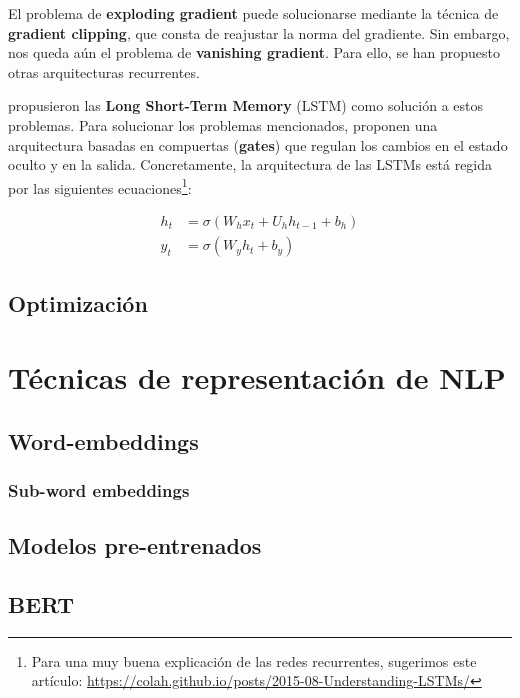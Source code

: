 El problema de \textbf{exploding gradient} puede solucionarse mediante la técnica de \textbf{gradient clipping}, que consta de reajustar la norma del gradiente. Sin embargo, nos queda aún el problema de \textbf{vanishing gradient}. Para ello, se han propuesto otras arquitecturas recurrentes.

\citet{hochreiter1997long} propusieron las \textbf{Long Short-Term Memory} (LSTM) como solución a estos problemas. Para solucionar los problemas mencionados, proponen una arquitectura basadas en compuertas (\textbf{gates}) que regulan los cambios en el estado oculto y en la salida. Concretamente, la arquitectura de las LSTMs está regida por las siguientes ecuaciones\footnote{Para una muy buena explicación de las redes recurrentes, sugerimos este artículo: \url{https://colah.github.io/posts/2015-08-Understanding-LSTMs/}}:


\begin{align}
    h_t &= \sigma(W_h x_t + U_h h_{t-1} + b_h) \\
    y_t &= \sigma(W_y h_t + b_y)
    \label{eq:lstm}
\end{align}



\subsection{Optimización}


\section{Técnicas de representación de NLP}
\subsection{Word-embeddings}



\subsubsection{Sub-word embeddings}

\subsection{Modelos pre-entrenados}

\subsection{BERT}
\label{sec:02_preliminar_bert}

